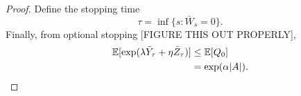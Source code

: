 \begin{proof}
	Define the stopping time 
	\begin{equation}
		\tau = \inf\{s: \bar{W}_s = 0\}.
	\end{equation}
	Finally, from optional stopping [FIGURE THIS OUT PROPERLY],
	\begin{align}
		\mathbb{E}[\exp(\lambda \bar{Y}_\tau  + \eta \bar{Z}_\tau)] &\leq \mathbb{E}[Q_{0}]\\
		&= \exp(\alpha |A|).
	\end{align}
\end{proof}